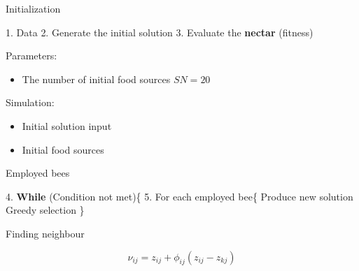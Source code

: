 \documentclass[14pt,ignorenonframetext,compress]{beamer}
\newenvironment{Shaded}{\begin{snugshade}}{\end{snugshade}}
\newcommand{\FloatTok}[1]{\textcolor[rgb]{0.00,0.00,0.81}{#1}}
\newcommand{\KeywordTok}[1]{\textcolor[rgb]{0.13,0.29,0.53}{\textbf{#1}}}
\newcommand{\NormalTok}[1]{#1}
\providecommand{\tightlist}{%
  \setlength{\itemsep}{0pt}\setlength{\parskip}{0pt}}
\renewenvironment{Shaded}{\color{black}\begin{snugshade}\color{black}}{\end{snugshade}}
\begin{document}
\begin{frame}[fragile]{Initialization}
\protect\hypertarget{initialization}{}

\begin{Shaded}
\begin{Highlighting}[]
 \FloatTok{1.}\NormalTok{ Data}
 \FloatTok{2.}\NormalTok{ Generate the initial solution}
 \FloatTok{3.}\NormalTok{ Evaluate the }\KeywordTok{nectar}\NormalTok{ (fitness)}
\end{Highlighting}
\end{Shaded}

Parameters:

\begin{itemize}
\tightlist
\item
  The number of initial food sources \(SN=20\)
\end{itemize}

Simulation:

\begin{itemize}
\tightlist
\item
  Initial solution input\\
\item
  Initial food sources
\end{itemize}

\end{frame}

\begin{frame}[fragile]{Employed bees}
\protect\hypertarget{employed-bees}{}

\begin{Shaded}
\begin{Highlighting}[]
 \FloatTok{4.} \KeywordTok{While}\NormalTok{ (Condition not met)\{}
 \FloatTok{5.}\NormalTok{ For each employed bee\{}
\NormalTok{     Produce new solution }
\NormalTok{     Greedy selection \}}
\end{Highlighting}
\end{Shaded}

\begin{block}{Finding neighbour}

\[\nu_{ij} = z_{ij} + \phi_{ij}(z_{ij}-z_{kj})\]

\end{block}

\end{frame}
\end{document}
